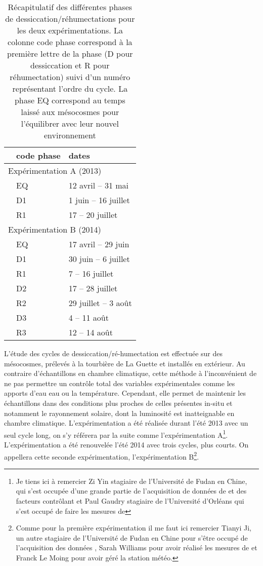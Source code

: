 \begin{table}
\centering
\caption{Récapitulatif des différentes phases de dessiccation/réhumectations pour les deux expérimentations. La colonne code phase correspond à la première lettre de la phase (D pour dessiccation et R pour réhumectation) suivi d'un numéro représentant l'ordre du cycle. La phase EQ correspond au temps laissé aux mésocosmes pour l'équilibrer avec leur nouvel environnement }
\label{table:recap_DR}
\begin{tabular}{lll}\toprule
 & code phase & dates \\ \midrule
\multicolumn{3}{l}{Expérimentation A (2013)} \\
 & EQ & 12 avril -- 31 mai \\ [+.5ex]
 & D1 & 1 juin -- 16 juillet  \\
 & R1 & 17 -- 20 juillet\\ [+1ex]
\multicolumn{3}{l}{Expérimentation B (2014)} \\
 & EQ & 17 avril -- 29 juin \\ [+.5ex]
 & D1 & 30 juin -- 6 juillet \\
 & R1 & 7 -- 16 juillet\\ [+.5ex]
 & D2 & 17 -- 28 juillet\\
 & R2 & 29 juillet -- 3 août\\[+.5ex]
 & D3 & 4 -- 11 août\\
 & R3 & 12 -- 14 août\\
\bottomrule
\end{tabular}
\end{table}


L'étude des cycles de dessiccation/ré-humectation est effectuée sur des mésocosmes, prélevés à la tourbière de La Guette et installés en extérieur.
Au contraire d'échantillons en chambre climatique, cette méthode à l'inconvénient de ne pas permettre un contrôle total des variables expérimentales comme les apports d'eau eau ou la température.
Cependant, elle permet de maintenir les échantillons dans des conditions plus proches de celles présentes in-situ et notamment le rayonnement solaire, dont la luminosité est inatteignable en chambre climatique.
L'expérimentation a été réalisée durant l'été 2013 avec un seul cycle long, on s'y référera par la suite comme l'expérimentation A\footnote{Je tiens ici à remercier Zi Yin stagiaire de l'Université de Fudan en Chine, qui s'est occupée d'une grande partie de l'acquisition de données de \coo et des facteurs contrôlant et Paul Gaudry stagiaire de l'Université d'Orléans qui s'est occupé de faire les mesures de \chh}.
L'expérimentation a été renouvelée l'été 2014 avec trois cycles, plus courts.
On appellera cette seconde expérimentation, l'expérimentation B\footnote{Comme pour la première expérimentation il me faut ici remercier Tianyi Ji, un autre stagiaire de l'Université de Fudan en Chine pour s'être occupé de l'acquisition des données \coo, Sarah Williams pour avoir réalisé les mesures de \chh et Franck Le Moing pour avoir géré la station météo.}.

